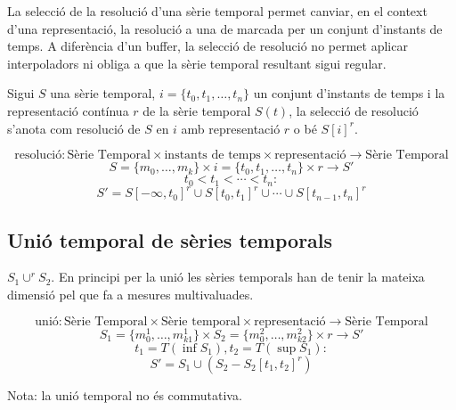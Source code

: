 {La selecció de la resolució d'una sèrie temporal permet canviar, en el
context d'una representació, la resolució a una de marcada per un
conjunt d'instants de temps. A diferència d'un buffer, la selecció de
resolució no permet aplicar interpoladors ni obliga a que la sèrie
temporal resultant sigui regular.

Sigui $S$ una sèrie temporal, $i= \{t_0,t_1,\dotsc,t_n\}$ un conjunt
d'instants de temps i la representació contínua $r$ de la sèrie
temporal $S(t)$, la selecció de resolució s'anota com resolució de $S$
en $i$ amb representació $r$ o bé $S[i]^r$.

\begin{definition}
  \[
  \text{resolució}: \text{Sèrie Temporal} \times \text{instants de
    temps} \times \text{representació} \longrightarrow \text{Sèrie
    Temporal}
  \]
  \[
  S = \{m_0 , \ldots , m_k\} \times i = \{t_0,t_1,\dotsc,t_n\} \times r
  \longrightarrow S'
  \]
  \[
  t_0 < t_1 < \dotsb < t_n:
  \]
  \[
  S' = S[-\infty,t_0]^r \cup  S[t_0,t_1]^r \cup \dotsb \cup S[t_{n-1},t_n]^r
  \] 
\end{definition}




\subsection{Unió temporal de sèries temporals}

$S_1 \cup^r S_2$. En principi per la unió les sèries temporals han de tenir la mateixa dimensió pel que fa a mesures multivaluades.

\begin{definition}
  \[
  \text{unió}: \text{Sèrie Temporal} \times \text{Sèrie temporal}
  \times \text{representació} \longrightarrow \text{Sèrie Temporal}
  \]
  \[
  S_1 = \{m_0^1 , \ldots , m_{k1}^1\}  \times S_2 = \{m_0^2 , \ldots , m_{k2}^2\} \times r \longrightarrow S'
  \]
  \[
  t_1=T(\inf S_1), t_2=T(\sup S_1):
  \]
  \[
  S' = S_1 \cup  ( S_2 - S_2[t_1,t_2]^r )
  \] 

  Nota: la unió temporal no és commutativa. 
\end{definition}


}
